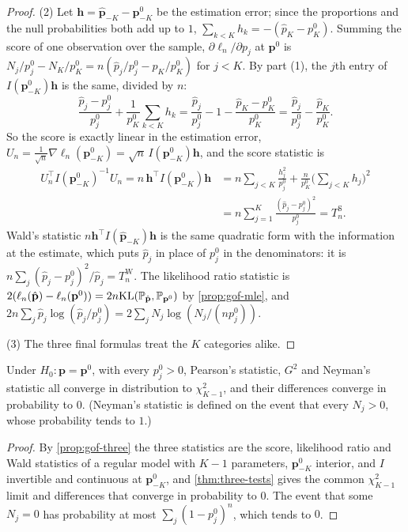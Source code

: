 \begin{proof}
(2) Let $\mathbf{h} = \hat{\mathbf{p}}_{-K} - \mathbf{p}^0_{-K}$ be the estimation error; since the proportions and the null probabilities both add up to $1$, $\sum_{k<K}h_k = -(\hat{p}_K - p^0_K)$.
Summing the score of one observation over the sample, $\partial\ell_n/\partial p_j$ at $\mathbf{p}^0$ is $N_j/p^0_j - N_K/p^0_K = n(\hat{p}_j/p^0_j - \hat{p}_K/p^0_K)$ for $j < K$.
By part (1), the $j$th entry of $I(\mathbf{p}^0_{-K})\mathbf{h}$ is the same, divided by $n$:
\[
\frac{\hat{p}_j - p^0_j}{p^0_j} + \frac{1}{p^0_K}\sum_{k<K}h_k = \frac{\hat{p}_j}{p^0_j} - 1 - \frac{\hat{p}_K - p^0_K}{p^0_K} = \frac{\hat{p}_j}{p^0_j} - \frac{\hat{p}_K}{p^0_K}.
\]
So the score is exactly linear in the estimation error, $U_n = \frac{1}{\sqrt{n}}\nabla\ell_n(\mathbf{p}^0_{-K}) = \sqrt{n}\,I(\mathbf{p}^0_{-K})\mathbf{h}$, and the score statistic is
\begin{align*}
U_n^\top I(\mathbf{p}^0_{-K})^{-1}U_n = n\,\mathbf{h}^\top I(\mathbf{p}^0_{-K})\mathbf{h} &= n\sum_{j<K}\frac{h_j^2}{p^0_j} + \frac{n}{p^0_K}\Big(\sum_{j<K}h_j\Big)^2 \\
&= n\sum_{j=1}^K\frac{(\hat{p}_j - p^0_j)^2}{p^0_j} = T^{\mathrm{S}}_n.
\end{align*}
Wald's statistic $n\mathbf{h}^\top I(\hat{\mathbf{p}}_{-K})\mathbf{h}$ is the same quadratic form with the information at the estimate, which puts $\hat{p}_j$ in place of $p^0_j$ in the denominators: it is $n\sum_j(\hat{p}_j - p^0_j)^2/\hat{p}_j = T^{\mathrm{W}}_n$.
The likelihood ratio statistic is $2(\ell_n(\hat{\mathbf{p}}) - \ell_n(\mathbf{p}^0)) = 2n\mathrm{KL}(\mathbb{P}_{\hat{\mathbf{p}}}, \mathbb{P}_{\mathbf{p}^0})$ by \cref{prop:gof-mle}, and $2n\sum_j\hat{p}_j\log(\hat{p}_j/p^0_j) = 2\sum_jN_j\log(N_j/(np^0_j))$.

(3) The three final formulas treat the $K$ categories alike.
\end{proof}

\begin{corollary}
\label{cor:gof-three}
Under $H_0: \mathbf{p} = \mathbf{p}^0$, with every $p^0_j > 0$, Pearson's statistic, $G^2$ and Neyman's statistic all converge in distribution to $\chi^2_{K-1}$, and their differences converge in probability to $0$. (Neyman's statistic is defined on the event that every $N_j > 0$, whose probability tends to $1$.)
\end{corollary}

\begin{proof}
By \cref{prop:gof-three} the three statistics are the score, likelihood ratio and Wald statistics of a regular model with $K - 1$ parameters, $\mathbf{p}^0_{-K}$ interior, and $I$ invertible and continuous at $\mathbf{p}^0_{-K}$, and \cref{thm:three-tests} gives the common $\chi^2_{K-1}$ limit and differences that converge in probability to $0$.
The event that some $N_j = 0$ has probability at most $\sum_j(1 - p^0_j)^n$, which tends to $0$.
\end{proof}

